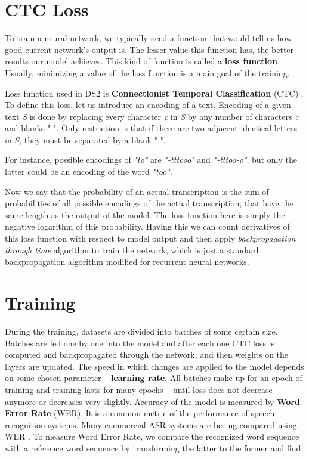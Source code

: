 \documentclass[licencjacka,en]{pracamgr}
\begin{document}
\section{CTC Loss} \label{sec:ctc}
To train a neural network, we typically need a function that would tell us how good current network's output is. The lesser value this function has, the better results our model achieves. This kind of function is called a \textbf{loss function}. Usually, minimizing a value of the loss function is a main goal of the training.

Loss function used in DS2 is \textbf{Connectionist Temporal Classification} (CTC) \cite{DS3}. To define this loss, let us introduce an encoding of a text. Encoding of a given text \textit{S} is done by replacing every character \textit{c} in \textit{S} by any number of characters \textit{c} and blanks "-". Only restriction is that if there are two adjacent identical letters in \textit{S}, they must be separated by a blank "-".

For instance, possible encodings of \textit{"to"} are \textit{"-tttooo"} and \textit{"-tttoo-o"}, but only the latter could be an encoding of the word \textit{"too"}.

Now we say that the probability of an actual transcription is the sum of probabilities of all possible encodings of the actual transcription, that have the same length as the output of the model. The loss function here is simply the negative logarithm of this probability. Having this we can count derivatives of this loss function with respect to model output and then apply \textit{backpropagation through time} algorithm to train the network, which is just a standard backpropagation algorithm modified for recurrent neural networks.

\section{Training} \label{sec:trainig}
During the training, datasets are divided into batches of some certain size. Batches are fed one by one into the model and after each one CTC loss is computed and backpropagated through the network, and then weights on the layers are updated. The speed in which changes are applied to the model depends on some chosen parameter -- \textbf{learning rate}. All batches make up for an epoch of training and training lasts for many epochs -- until loss does not decrease anymore or decreases very slightly.
Accuracy of the model is measured by \textbf{Word Error Rate} (WER). It is a common metric of the performance of speech recognition systems. Many commercial ASR systems are beeing compared using WER \cite{DS8}. To measure Word Error Rate, we compare the recognized word sequence with a reference word sequence by transforming the latter to the former and find:
\end{document}
